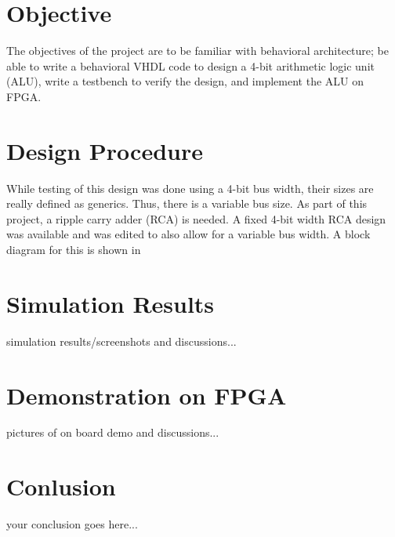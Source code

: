 \documentclass[12pt]{article}
\begin{document}
\newpage

\section{Objective} \label{sec:obj}
The objectives of the project are to be familiar with behavioral architecture; be able
to write a behavioral VHDL code to design a 4-bit arithmetic logic unit (ALU), write
a testbench to verify the design, and implement the ALU on FPGA.

\section{Design Procedure} \label{sec:desproc}
While testing of this design was done using a 4-bit bus width, their sizes are really defined as generics.  Thus, there is a variable bus size.  As part of this project, a ripple carry adder (RCA) is needed.  A fixed 4-bit width RCA design was available and was edited to also allow for a variable bus width.  A block diagram for this is shown in %


\section{Simulation Results} \label{simresults}
simulation results/screenshots and discussions...

\section{Demonstration on FPGA} \label{demo}
pictures of on board demo and discussions...
 
\section{Conlusion} \label{cncl}
your conclusion goes here...
\end{document}
